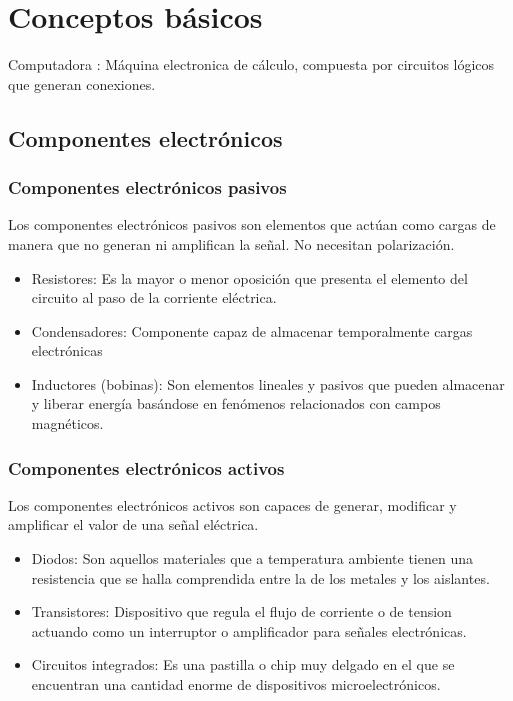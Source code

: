 \chapter{Conceptos b\'asicos}
Computadora : M\'aquina electronica de c\'alculo, compuesta por circuitos l\'ogicos que generan conexiones.\\




\section{Componentes electr\'onicos}
\subsection{Componentes electr\'onicos pasivos}
Los componentes electr\'onicos pasivos son elementos que act\'uan como cargas de manera que no generan ni amplifican la se\~nal. No necesitan polarizaci\'on.
\begin{itemize}
\item Resistores: Es la mayor o menor oposici\'on que presenta el elemento del circuito al paso de la corriente el\'ectrica.
\item Condensadores: Componente capaz de almacenar temporalmente cargas electr\'onicas
\item Inductores (bobinas): Son elementos lineales y pasivos que pueden almacenar y liberar energ\'ia bas\'andose en fen\'omenos relacionados con campos magn\'eticos.
\end{itemize}

\subsection{Componentes electr\'onicos activos}
Los componentes electr\'onicos activos son capaces de generar, modificar y amplificar el valor de una se\~nal el\'ectrica.

\begin{itemize}
\item Diodos: Son aquellos materiales que a temperatura ambiente tienen una resistencia que se halla comprendida entre la de los metales y los aislantes.
\item Transistores: Dispositivo que regula el flujo de corriente o de tension actuando como un interruptor o amplificador para se\~nales electr\'onicas.
\item Circuitos integrados: Es una pastilla o chip muy delgado en el que se encuentran una cantidad enorme de dispositivos microelectr\'onicos.
\end{itemize}

